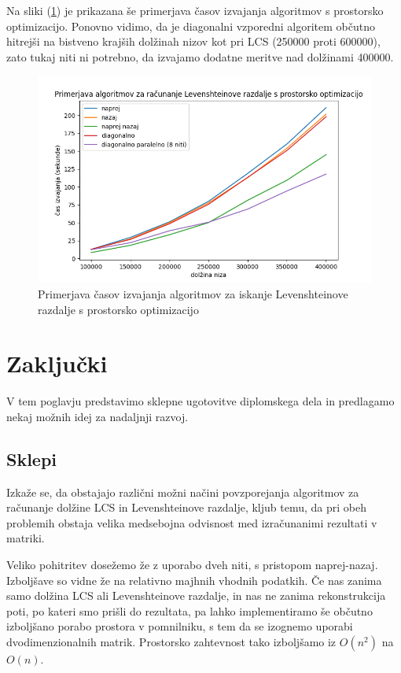 \documentclass[a4paper,12pt,openright]{book}
\begin{document}
Na sliki (\ref{comparison6}) je prikazana še primerjava časov izvajanja algoritmov s prostorsko optimizacijo. Ponovno vidimo, da je diagonalni vzporedni algoritem občutno hitrejši na bistveno krajših dolžinah nizov kot pri LCS (250000 proti 600000), zato tukaj niti ni potrebno, da izvajamo dodatne meritve nad dolžinami 400000. 

\begin{figure}[htb]
\begin{center}
\includegraphics[width=1.0\textwidth]{plots/LevenshteinSpace.png}
\end{center}
\caption{Primerjava časov izvajanja algoritmov za iskanje Levenshteinove razdalje s prostorsko optimizacijo}
\label{comparison6}
\end{figure}

\chapter{Zaključki}

V tem poglavju predstavimo sklepne ugotovitve diplomskega dela in predlagamo nekaj možnih idej za nadaljnji razvoj.

\section{Sklepi}

Izkaže se, da obstajajo različni možni načini povzporejanja algoritmov za računanje dolžine LCS in Levenshteinove razdalje, kljub temu, da pri obeh problemih obstaja velika medsebojna odvisnost med izračunanimi rezultati v matriki. 

Veliko pohitritev dosežemo že z uporabo dveh niti, s pristopom naprej-nazaj. Izboljšave so vidne že na relativno majhnih vhodnih podatkih. Če nas zanima samo dolžina LCS ali Levenshteinove razdalje, in nas ne zanima rekonstrukcija poti, po kateri smo prišli do rezultata, pa lahko implementiramo še občutno izboljšano porabo prostora v pomnilniku, s tem da se izognemo uporabi dvodimenzionalnih matrik. Prostorsko zahtevnost tako izboljšamo iz $O(n^2)$ na $O(n)$. 
\end{document}
